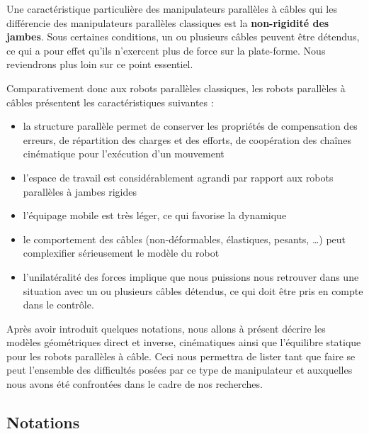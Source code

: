 Une caractéristique particulière des manipulateurs parallèles à câbles qui les 
différencie des manipulateurs parallèles classiques est la {\bf non-rigidité 
des 
jam\-bes}. Sous certaines conditions, un ou plusieurs câbles peuvent être 
détendus, ce qui a pour effet qu'ils n'exercent plus de force sur la 
plate-forme. Nous reviendrons plus loin sur ce point essentiel.

Comparativement donc aux robots parallèles classiques, les robots parallèles à 
câbles présentent les caractéristiques suivantes :
\begin{itemize}
 \item la structure parallèle permet de conserver les propriétés de 
compensation 
des erreurs, de répartition des charges et des efforts, de coopération des 
chaînes cinématique pour l'exécution d'un mouvement
 \item l'espace de travail est considérablement agrandi par rapport aux robots 
parallèles à jambes rigides
 \item l'équipage mobile est très léger, ce qui favorise la dynamique
 \item le comportement des câbles (non-déformables, élastiques, pesants, \dots) 
peut complexifier s\'erieusement le modèle du robot
 \item l'unilatéralité des forces implique que nous puissions nous retrouver 
dans une situation avec un ou plusieurs câbles détendus, ce qui doit être pris 
en compte dans le contrôle.
\end{itemize}

Après avoir introduit quelques notations, nous allons à présent décrire les 
modèles géométriques direct et inverse, cinématiques ainsi que l'équilibre 
statique pour les robots parallèles à câble. Ceci nous permettra de lister tant 
que faire se peut l'ensemble des difficultés posées par ce type de manipulateur 
et auxquelles nous avons été confrontées dans le cadre de nos recherches.

\subsection{Notations} \label{chap0-1-0}

\begin{figure}[!ht]
\centering
\def\svgwidth{.85\linewidth}

\end{figure}

